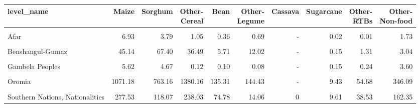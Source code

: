 \begin{table}[!h]
\centering
\begin{tabular}{lrrrrrrrrr}
\toprule
level\_name & Maize & Sorghum & \makecell{Other-\\Cereal} & Bean & \makecell{Other-\\Legume} & Cassava & Sugarcane & \makecell{Other-\\RTBs} & \makecell{Other-\\Non-food}\\
\midrule
\cellcolor{gray!10}{Addis Abeba} & \cellcolor{gray!10}{0.01} & \cellcolor{gray!10}{0.09} & \cellcolor{gray!10}{1.92} & \cellcolor{gray!10}{0.00} & \cellcolor{gray!10}{0.00} & \cellcolor{gray!10}{-} & \cellcolor{gray!10}{0.01} & \cellcolor{gray!10}{0.01} & \cellcolor{gray!10}{-}\\
Afar & 6.93 & 3.79 & 1.05 & 0.36 & 0.69 & - & 0.02 & 0.01 & 1.73\\
\cellcolor{gray!10}{Amhara} & \cellcolor{gray!10}{426.54} & \cellcolor{gray!10}{608.07} & \cellcolor{gray!10}{1059.20} & \cellcolor{gray!10}{49.73} & \cellcolor{gray!10}{184.06} & \cellcolor{gray!10}{-} & \cellcolor{gray!10}{2.11} & \cellcolor{gray!10}{26.94} & \cellcolor{gray!10}{38.36}\\
Benshangul-Gumaz & 45.14 & 67.40 & 36.49 & 5.71 & 12.02 & - & 0.15 & 1.31 & 3.04\\
\cellcolor{gray!10}{Dire Dawa} & \cellcolor{gray!10}{2.17} & \cellcolor{gray!10}{11.49} & \cellcolor{gray!10}{0.56} & \cellcolor{gray!10}{0.41} & \cellcolor{gray!10}{0.30} & \cellcolor{gray!10}{-} & \cellcolor{gray!10}{0.01} & \cellcolor{gray!10}{0.37} & \cellcolor{gray!10}{0.29}\\
\addlinespace
Gambela Peoples & 5.62 & 4.67 & 0.12 & 0.10 & 0.08 & - & 0.15 & 0.24 & 3.60\\
\cellcolor{gray!10}{Harari People} & \cellcolor{gray!10}{2.39} & \cellcolor{gray!10}{8.92} & \cellcolor{gray!10}{0.61} & \cellcolor{gray!10}{0.11} & \cellcolor{gray!10}{2.16} & \cellcolor{gray!10}{-} & \cellcolor{gray!10}{0.18} & \cellcolor{gray!10}{0.40} & \cellcolor{gray!10}{0.18}\\
Oromia & 1071.18 & 763.16 & 1380.16 & 135.31 & 144.43 & - & 9.43 & 54.68 & 346.09\\
\cellcolor{gray!10}{Somali} & \cellcolor{gray!10}{19.94} & \cellcolor{gray!10}{24.33} & \cellcolor{gray!10}{5.92} & \cellcolor{gray!10}{0.59} & \cellcolor{gray!10}{2.25} & \cellcolor{gray!10}{0} & \cellcolor{gray!10}{0.01} & \cellcolor{gray!10}{0.50} & \cellcolor{gray!10}{0.26}\\
Southern Nations, Nationalities & 277.53 & 118.07 & 238.03 & 74.78 & 14.06 & 0 & 9.61 & 38.53 & 162.35\\
\bottomrule
\end{tabular}
\end{table}
